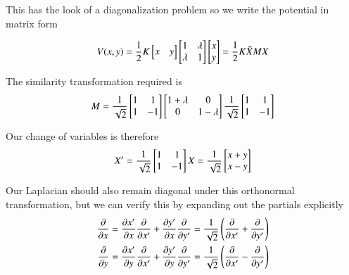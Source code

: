 This has the look of a diagonalization problem so we write the potential in matrix form

\begin{align}\label{eqn:desaiCh9:501}
V(x,y)
= \inv{2} K
\begin{bmatrix}
x & y
\end{bmatrix}
\begin{bmatrix}
1 & \lambda \\
\lambda & 1
\end{bmatrix}
\begin{bmatrix}
x \\ y
\end{bmatrix} = \inv{2} K \tilde{X} M X
\end{align}

The similarity transformation required is
\begin{align}\label{eqn:desaiCh9:502}
M = \inv{\sqrt{2}}
\begin{bmatrix}
1 & 1 \\
1 & -1
\end{bmatrix}
\begin{bmatrix}
1+ \lambda & 0 \\
0 & 1 - \lambda
\end{bmatrix}
\inv{\sqrt{2}}
\begin{bmatrix}
1 & 1 \\
1 & -1
\end{bmatrix}
\end{align}

Our change of variables is therefore
\begin{align}\label{eqn:desaiCh9:503}
X' =
\inv{\sqrt{2}}
\begin{bmatrix}
1 & 1 \\
1 & -1
\end{bmatrix}
X
=
\inv{\sqrt{2}}
\begin{bmatrix}
x + y \\
x - y
\end{bmatrix}
\end{align}

Our Laplacian should also remain diagonal under this orthonormal transformation, but we can verify this by expanding out the partials explicitly
\begin{align}\label{eqn:desaiCh9:504}
\PD{x}{} &=
\PD{x}{x'}\PD{x'}{}
+\PD{x}{y'}\PD{y'}{} = \inv{\sqrt{2}} \left( \PD{x'}{} + \PD{y'}{} \right) \\
\PD{y}{} &=
\PD{y}{x'}\PD{x'}{} +\PD{y}{y'}\PD{y'}{}
= \inv{\sqrt{2}}
\left( \PD{x'}{} - \PD{y'}{} \right)
\end{align}

